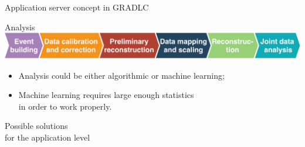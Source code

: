
\begin{frame}{Application server concept in GRADLC}

\end{frame}


\begin{frame}{Analysis}
    \includegraphics[width=1\textwidth]{pics/an_steps.pdf}
    \vspace{2em}
    \begin{itemize}
        \item Analysis could be either algorithmic or machine learning;
        \item Machine learning requires large enough statistics\\in order to work properly.
    \end{itemize}
\end{frame}



\begin{frame}{Possible solutions \\for the application level}
 
\end{frame}
